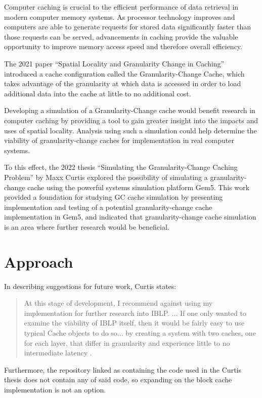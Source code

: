 \documentclass[12pt,twoside]{reedthesis}
\begin{document}
Computer caching is crucial to the efficient performance of data retrieval in modern computer memory systems. As processor technology improves and computers are able to generate requests for stored data significantly faster than those requests can be served, advancements in caching provide the valuable opportunity to improve memory access speed and therefore overall efficiency.

The 2021 paper ``Spatial Locality and Granularity Change in Caching'' introduced a cache configuration called the Granularity-Change Cache, which takes advantage of the granularity at which data is accessed in order to load additional data into the cache at little to no additional cost.

Developing a simulation of a Granularity-Change cache would benefit research in computer caching by providing a tool to gain greater insight into the impacts and uses of spatial locality. Analysis using such a simulation could help determine the viability of granularity-change caches for implementation in real computer systems.

To this effect, the 2022 thesis ``Simulating the Granularity-Change Caching Problem'' by Maxx Curtis explored the possibility of simulating a granularity-change cache using the powerful systems simulation platform Gem5. This work provided a foundation for studying GC cache simulation by presenting implementation and testing of a potential granularity-change cache implementation in Gem5, and indicated that granularity-change cache simulation is an area where further research would be beneficial.

\section{Approach}

	In describing suggestions for future work, Curtis states: \begin{quote}
		At this stage of development, I recommend against using my implementation for further research into IBLP. ... If one only wanted to examine the viability of IBLP itself, then it would be fairly easy to use typical Cache objects to do so... by creating a system with two caches, one for each layer, that differ in granularity and experience little to no intermediate latency \cite{curtis}.
	\end{quote}

	Furthermore, the repository linked as containing the code used in the Curtis thesis does not contain any of said code, so expanding on the block cache implementation is not an option.
\end{document}

